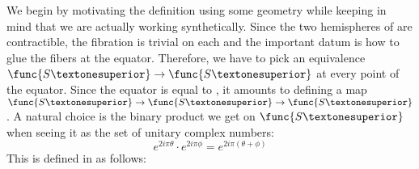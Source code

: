 We begin by motivating the definition using some geometry while
keeping in mind that we are actually working synthetically. Since the
two hemispheres of  are contractible, the fibration is
trivial on each and the important datum is how to glue the fibers at
the equator. Therefore, we have to pick an equivalence
\( \func{S¹} \to \func{S¹} \) at every point of the equator.  Since
the equator is equal to , it amounts to defining a map
\( \func{S¹} \to \func{S¹} \to \func{S¹} \). A natural choice is the
binary product we get on \( \func{S¹} \) when seeing it as the set of
unitary complex numbers:
\[
e^{2i\pi \theta} \cdot e^{2i\pi \phi} = e^{2i\pi (\theta + \phi)}
\]
This is defined in \CubicalAgda as follows:
%

